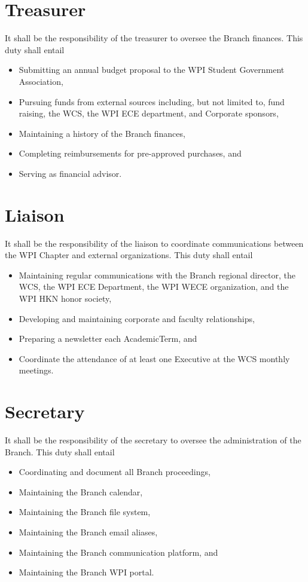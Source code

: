 \section{Treasurer}\label{Bylaw:ExectiveBoard:Treasurer}
	It shall be the responsibility of the treasurer to oversee the \gls{Branch} finances. This duty shall entail
	\begin{itemize}
		\item{Submitting an annual budget proposal to the \gls{WPI} Student Government Association,}
		\item{Pursuing funds from external sources including, but not limited to, fund raising, the \gls{WCS}, the \gls{WPI} ECE department, and Corporate sponsors, }
		\item{Maintaining a history of the \gls{Branch} finances,}
		\item{Completing reimbursements for pre-approved purchases, and}
		\item{Serving as financial advisor.}
	\end{itemize}

\section{Liaison}\label{Bylaw:ExectiveBoard:Liaison}
	It shall be the responsibility of the liaison to coordinate communications between the WPI Chapter and external organizations. This duty shall entail
	\begin{itemize}
		\item{Maintaining regular communications with the \gls{Branch} regional director, the \gls{WCS}, the \gls{WPI} ECE Department, the \gls{WPI} \gls{WECE} organization, and the WPI \gls{HKN} honor society,}
		\item{Developing and maintaining corporate and faculty relationships,}
		\item{Preparing a newsletter each \gls{AcademicTerm}, and}
		\item{Coordinate the attendance of at least one \gls{Executive} at the \gls{WCS} monthly meetings.}
	\end{itemize}

\section{Secretary}\label{Bylaw:ExectiveBoard:Secretary}
	It shall be the responsibility of the secretary to oversee the administration of the \gls{Branch}. This duty shall entail
	\begin{itemize}
		\item{Coordinating and document all \gls{Branch} proceedings,}
		\item{Maintaining the \gls{Branch} calendar,}
		\item{Maintaining the \gls{Branch} file system,}
		\item{Maintaining the \gls{Branch} email aliases,}
		\item{Maintaining the \gls{Branch} communication platform, and}
		\item{Maintaining the \gls{Branch} \gls{WPI} portal.}
	\end{itemize}

